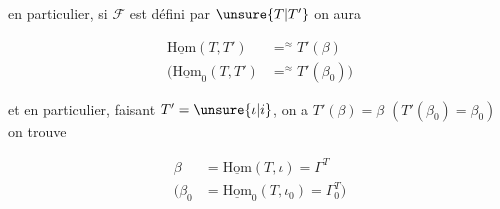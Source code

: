 en particulier, si $\mathcal F$ est défini par $\unsure{T|T'}$ on aura

\[
\begin{aligned}
\underline{\mathrm{Hom}}(T,T')&\mathrel{\mathop{=}^{\approx}}T'(\beta)\\
(\underline{\mathrm{Hom}}_0(T,T')&\mathrel{\mathop{=}^{\approx}}T'(\beta_0))
\end{aligned}
\]

et en particulier, faisant $T'=\unsure{\iota|i}$,  on a $T'(\beta)=\beta$ $(T'(\beta_0)=\beta_0)$
on trouve

\[
\begin{aligned}
\beta&=\underline{\mathrm{Hom}}(T,\iota)=\Gamma^{T}\\
(\beta_0&=\underline{\mathrm{Hom}}_0(T,\iota_0)=\Gamma_0^{T})
\end{aligned}
\]
